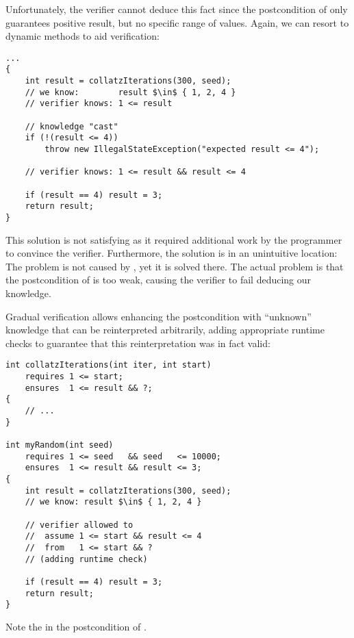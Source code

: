 Unfortunately, the verifier cannot deduce this fact since the postcondition of  only guarantees positive result, but no specific range of values.
Again, we can resort to dynamic methods to aid verification:

\begin{lstlisting}
...
{
    int result = collatzIterations(300, seed);
    // we know:        result $\in$ { 1, 2, 4 }
    // verifier knows: 1 <= result
    
    // knowledge "cast"
    if (!(result <= 4))
        throw new IllegalStateException("expected result <= 4");

    // verifier knows: 1 <= result && result <= 4 
    
    if (result == 4) result = 3;
    return result;
}
\end{lstlisting}

This solution is not satisfying as it required additional work by the programmer to convince the verifier.
Furthermore, the solution is in an unintuitive location:
The problem is not caused by , yet it is solved there.
The actual problem is that the postcondition of  is too weak, causing the verifier to fail deducing our knowledge.

Gradual verification allows enhancing the postcondition with “unknown” knowledge that can be reinterpreted arbitrarily, adding appropriate runtime checks to guarantee that this reinterpretation was in fact valid:
\begin{lstlisting}
int collatzIterations(int iter, int start)
    requires 1 <= start;
    ensures  1 <= result && ?;
{
    // ...
}

int myRandom(int seed)
    requires 1 <= seed   && seed   <= 10000;
    ensures  1 <= result && result <= 3;
{
    int result = collatzIterations(300, seed);
    // we know: result $\in$ { 1, 2, 4 }
    
    // verifier allowed to
    //  assume 1 <= start && result <= 4
    //  from   1 <= start && ?
    // (adding runtime check)
    
    if (result == 4) result = 3;
    return result;
}
\end{lstlisting}
Note the  in the postcondition of .


